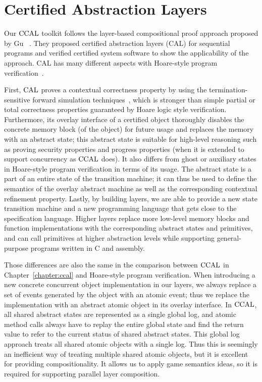 
\section{Certified Abstraction Layers}
\label{chatper:related:sec:certified-abstraction-laayers}


Our $\mathrm{CCAL}$ toolkit follows the layer-based compositional proof approach proposed by Gu \etal~\cite{deepspec}.
They proposed certified abstraction layers (CAL) for sequential programs and 
verified certified system software to show the applicability of the approach.
CAL has many different aspects with
 Hoare-style program verification~\cite{hoare69,reynolds02,boogie05,nanevski06}.

First, $\mathrm{CAL}$ proves a contextual correctness property by using the termination-sensitive forward simulation 
techniques~\cite{Lynch95,compcert}, 
which is stronger than simple partial or total correctness properties guaranteed by Hoare logic style verification.
Furthermore, its overlay interface of a certified object thoroughly disables 
the concrete memory block (of the object)  for  future usage 
and replaces the memory with an abstract state;
this abstract state is suitable for high-level reasoning such as proving security properties and progress properties (when it is extended to support
concurrency as $\mathrm{CCAL}$ does). 
It also differs from ghost or auxiliary states in Hoare-style program verification in terms of 
its usage.
The abstract state is a part of an entire state of the transition machine; 
it can thus be used to define the semantics of the overlay abstract machine
as well as the corresponding contextual refinement property.
Lastly,  by building layers, we are able to provide a new state transition machine and a new programming language that gets close to the specification language. 
Higher layers replace more low-level memory blocks and function implementations with 
the corresponding abstract states and primitives,
and can call primitives at higher abstraction levels while  
supporting general-purpose
programs written in C and assembly.

Those differences are also the same in the comparison between $\mathrm{CCAL}$ in Chapter~\ref{chapter:ccal} and 
Hoare-style program verification. 
When introducing a new concrete concurrent object implementation in our layers, 
we always replace a set of events generated by the object with an atomic event; thus we replace the implementation with an abstract atomic object in its overlay interface. 
In $\mathrm{CCAL}$,
all shared abstract states are represented as a single global log,
and atomic method calls always have to 
replay the entire global state and find the return value to refer to the current status of shared abstract states.
This global log approach treats all shared atomic objects with a single log.
Thus this is seemingly an inefficient way of treating multiple shared atomic objects,
but it is excellent for providing compositionality. 
It allows us to apply game semantics ideas, so it
is required for supporting parallel layer composition.





